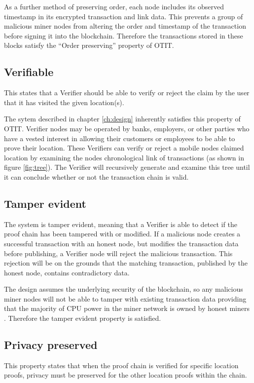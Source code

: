 As a further method of preserving order, each node includes its observed timestamp in its encrypted transaction and link data. This prevents a group of malicious miner nodes from altering the order and timestamp of the transaction before signing it into the blockchain. Therefore the transactions stored in these blocks satisfy the ``Order preserving'' property of OTIT.

\subsection{Verifiable}
This states that a Verifier should be able to verify or reject the claim by the user that it has visited the given location(s).

The sytem described in chapter \ref{ch:design} inherently satisfies this property of OTIT. Verifier nodes may be operated by banks, employers, or other parties who have a vested interest in allowing their customers or employees to be able to prove their location. These Verifiers can verify or reject a mobile nodes claimed location by examining the nodes chronological link of transactions (as shown in figure \ref{fig:tree}). The Verifier will recursively generate and examine this tree until it can conclude whether or not the transaction chain is valid.

\subsection{Tamper evident}
The system is tamper evident, meaning that a Verifier is able to detect if the proof chain has been tampered with or modified. If a malicious node creates a successful transaction with an honest node, but modifies the transaction data before publishing, a Verifier node will reject the malicious transaction. This rejection will be on the grounds that the matching transaction, published by the honest node, contains contradictory data.

The design assumes the underlying security of the blockchain, so any malicious miner nodes will not be able to tamper with existing transaction data providing that the majority of CPU power in the miner network is owned by honest miners \cite{bitcoin}. Therefore the tamper evident property is satisfied.

\subsection{Privacy preserved}
This property states that when the proof chain is verified for specific location proofs, privacy must be preserved for the other location proofs within the chain.


